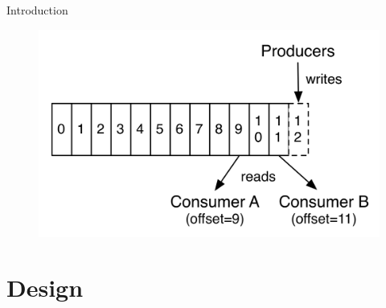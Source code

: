 \begin{frame}[plain,t]{Introduction} %
    \vspace{2ex}
    
     \begin{figure}
        \centering
        \includegraphics[width=0.9\linewidth]{image/0104}
        \label{fig:0104}
    \end{figure}
    
    
    
\end{frame}
\section{Design}
